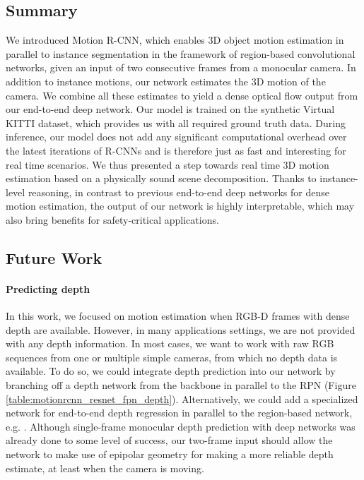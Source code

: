 \subsection{Summary}

We introduced Motion R-CNN, which enables 3D object motion estimation in parallel
to instance segmentation in the framework of region-based convolutional networks,
given an input of two consecutive frames from a monocular camera.
In addition to instance motions, our network estimates the 3D motion of the camera.
We combine all these estimates to yield a dense optical flow output from our
end-to-end deep network.
Our model is trained on the synthetic Virtual KITTI dataset, which provides
us with all required ground truth data.
During inference, our model does not add any significant computational overhead
over the latest iterations of R-CNNs and is therefore just as fast and interesting
for real time scenarios.
We thus presented a step towards real time 3D motion estimation based on a
physically sound scene decomposition. Thanks to instance-level reasoning, in contrast
to previous end-to-end deep networks for dense motion estimation, the output
of our network is highly interpretable, which may also bring benefits for safety-critical
applications.

\subsection{Future Work}
\paragraph{Predicting depth}
In this work, we focused on motion estimation when RGB-D frames with dense depth are available.
However, in many applications settings, we are not provided with any depth information.
In most cases, we want to work with raw RGB sequences from one or multiple simple cameras,
from which no depth data is available.
To do so, we could integrate depth prediction into our network by branching off a
depth network from the backbone in parallel to the RPN (Figure \ref{table:motionrcnn_resnet_fpn_depth}).
Alternatively, we could add a specialized network for end-to-end depth regression
in parallel to the region-based network, e.g. \cite{GCNet}.
Although single-frame monocular depth prediction with deep networks was already done
to some level of success,
our two-frame input should allow the network to make use of epipolar
geometry for making a more reliable depth estimate, at least when the camera
is moving.

